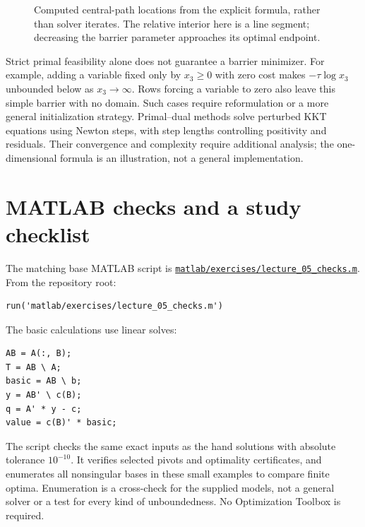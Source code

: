\documentclass[11pt,a4paper]{article}
\begin{document}
\begin{figure}[H]
  \centering
  \caption{Computed central-path locations from the explicit formula, rather
    than solver iterates. The relative interior here is a line segment;
    decreasing the barrier parameter approaches its optimal endpoint.}
  \label{fig:central-path}
\end{figure}
Strict primal feasibility alone does not guarantee a barrier minimizer.
For example, adding a variable fixed only by $x_3\geq0$ with zero cost makes
$-\tau\log x_3$ unbounded below as $x_3\to\infty$.
Rows forcing a variable to zero also leave this simple barrier with no domain.
Such cases require reformulation or a more general initialization strategy.
Primal--dual methods solve perturbed KKT equations using Newton steps, with
step lengths controlling positivity and residuals. Their convergence and
complexity require additional analysis; the one-dimensional formula is an
illustration, not a general implementation.

\section{MATLAB checks and a study checklist}\label{sec:matlab}
The matching base MATLAB script is
\href{../../matlab/exercises/lecture_05_checks.m}{\texttt{matlab/exercises/lecture\_05\_checks.m}}.
From the repository root:
\begin{lstlisting}
run('matlab/exercises/lecture_05_checks.m')
\end{lstlisting}
The basic calculations use linear solves:
\begin{lstlisting}
AB = A(:, B);
T = AB \ A;
basic = AB \ b;
y = AB' \ c(B);
q = A' * y - c;
value = c(B)' * basic;
\end{lstlisting}
The script checks the same exact inputs as the hand solutions with absolute
tolerance $10^{-10}$. It verifies selected pivots and optimality certificates,
and enumerates all nonsingular bases in these small examples to compare
finite optima. Enumeration is a cross-check for the supplied models, not a
general solver or a test for every kind of unboundedness.
No Optimization Toolbox is required.
\end{document}
